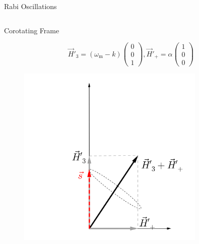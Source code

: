 \documentclass[9pt]{beamer}
\begin{document}
\begin{darkframes}
\begin{frame}{Rabi Oscillations}
{\begin{columns}[T]
\begin{column}
\centering
Corotating Frame

\begin{equation*}
    \vec H'_3 = (\omega_{\mathrm m} - k)\begin{pmatrix}
    0 \\
    0\\
    1
    \end{pmatrix}, \vec H'_+ = \alpha  \begin{pmatrix}
    1 \\
    0\\
    0
    \end{pmatrix}
\end{equation*}

\begin{figure}
    \centering
    \includegraphics[width=0.8\textwidth]{assets/rabi-isospin-rotating-frame}
\end{figure}





\end{column}
\end{columns}


}




\end{frame}
\end{darkframes}
\end{document}
